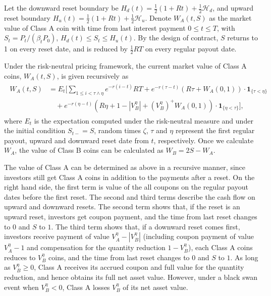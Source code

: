 \documentclass[final,pdftex]{ectaart}
\theoremstyle{plain}
\begin{document}
Let the downward reset boundary be $H_{d}(t)=\frac{1}{2}(1+Rt)+\frac{1}{2}\mathcal{H}_{d}$, and upward reset boundary $H_{u}(t)=\frac{1}{2}(1+Rt)+\frac{1}{2}\mathcal{H}_{u}$. Denote $W_{A}(t,S)$ as the market value of Class A coin with time from last interest payment $0\le t\le T$, with $S_t=P_t/(\beta_t P_0)$, $H_{d}(t)\le S_t \le H_{u}(t)$. By the design of contract, $S$ returns to 1 on every reset date, and is reduced by $\frac{1}{2}RT$ on every regular payout date.

Under the risk-neutral pricing framework, the current market value of Class A coins, $W_A(t,S)$, is given recursively as
\begin{align}
\begin{split}W_{A}(t,S) & =E_{t}\Bigg[\sum_{1\le i<\tau\land\eta}e^{-r(i-t)}RT+e^{-r(\tau-t)}(R\tau+W_{A}(0,1))\cdot\mathbf{1}_{\{\tau<\eta\}}\\
 & \quad+e^{-r(\eta-t)}(R\eta+1-|V_{B}^{\eta}|+(V_{B}^{\eta})^+W_{A}(0,1))\cdot\mathbf{1}_{\{\eta<\tau\}}\Bigg],
\end{split}
\label{VAL2}
\end{align}
where $E_{t}$ is the expectation computed under the risk-neutral measure and under the initial condition $S_{t-}=S$, random times $\zeta$, $\tau$ and $\eta$ represent the first regular payout, upward and downward reset date from $t$, respectively. Once we calculate $W_A$, the value of Class B coins can be calculated as $W_B=2S- W_A$.

The value of Class A can be determined as above in a recursive manner, since investors still get Class A coins in addition to the payments after a reset. On the right hand side, the first term is value of the all coupons on the regular payout dates before the first reset. The second and third terms describe the cash flow on upward and downward resets. The second term shows that, if the reset is an upward reset, investors get coupon payment, and the time from last reset changes to 0 and $S$ to $1$. The third term shows that, if a downward reset comes first, investors receive payment of value $V_{A}^{\eta}-|V_{B}^{\eta}|$ (including coupon payment of value $V_{A}^{\eta}-1$ and compensation for the quantity reduction $1-V_{B}^{\eta}$), each Class A coins reduces to $V_{B}^{\eta}$ coins, and the time from last reset changes to 0 and $S$ to $1$. As long as $V_B^\eta\ge 0$, Class A receives its accrued coupon and full value for the quantity reduction, and hence obtains its full net asset value. However, under a black swan event when $V_B^{\eta}<0$, Class A losses $V_B^{\eta}$ of its net asset value.
\end{document}
